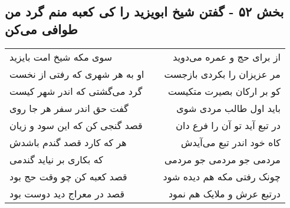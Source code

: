 \begin{center}
\section*{بخش ۵۲ - گفتن شیخ ابویزید را کی کعبه منم  گرد من طوافی می‌کن}
\label{sec:sh052}
\begin{longtable}{l p{0.5cm} r}
سوی مکه شیخ امت بایزید
&&
از برای حج و عمره می‌دوید
\\
او به هر شهری که رفتی از نخست
&&
مر عزیزان را بکردی بازجست
\\
گرد می‌گشتی که اندر شهر کیست
&&
کو بر ارکان بصیرت متکیست
\\
گفت حق اندر سفر هر جا روی
&&
باید اول طالب مردی شوی
\\
قصد گنجی کن که این سود و زیان
&&
در تبع آید تو آن را فرع دان
\\
هر که کارد قصد گندم باشدش
&&
کاه خود اندر تبع می‌آیدش
\\
که بکاری بر نیاید گندمی
&&
مردمی جو مردمی جو مردمی
\\
قصد کعبه کن چو وقت حج بود
&&
چونک رفتی مکه هم دیده شود
\\
قصد در معراج دید دوست بود
&&
درتبع عرش و ملایک هم نمود
\\
\end{longtable}
\end{center}
